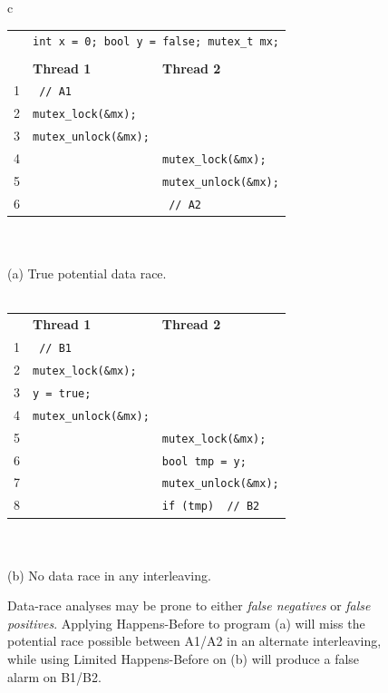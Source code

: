 \begin{figure}[t]
        \small
	\begin{center}
\begin{tabular}{c}
\begin{tabular}{rll}
        & \multicolumn{2}{c}{\texttt{int x = 0; bool y = false; mutex\_t mx;}} \\
        \\
        & {\bf Thread 1} & {\bf Thread 2} \\
        1 & \texttt{\hilight{brickred}{x++;}~// A1} & \\
        2 & \texttt{mutex\_lock(\&mx);} & \\
        3 & \texttt{mutex\_unlock(\&mx);} & \\
        4 & & \texttt{mutex\_lock(\&mx);} \\
        5 & & \texttt{mutex\_unlock(\&mx);} \\
        6 & & \texttt{\hilight{brickred}{x++;}~// A2} \\
\end{tabular}
\\
\\
	{\normalsize (a) True potential data race.}
\\
\\
\begin{tabular}{rll}
        & {\bf Thread 1} & {\bf Thread 2} \\
        1 & \texttt{\hilight{brickred}{x++;}~// B1} & \\
        2 & \texttt{mutex\_lock(\&mx);} & \\
        3 & \texttt{y = true;} & \\
        4 & \texttt{mutex\_unlock(\&mx);} & \\
        5 & & \texttt{mutex\_lock(\&mx);} \\
        6 & & \texttt{bool tmp = y;} \\
        7 & & \texttt{mutex\_unlock(\&mx);} \\
        8 & & \texttt{if (tmp) \hilight{brickred}{x++;}~// B2} \\
\end{tabular}
\\
\\
{\normalsize (b) No data race in any interleaving.}
\end{tabular}
	\end{center}
\caption{{Data-race analyses may be prone to either {\em false negatives} or {\em false positives}.
Applying Happens-Before to program (a) will miss the potential race possible between A1/A2 in an alternate interleaving,
while using Limited Happens-Before on (b) will produce a false alarm on B1/B2.}}
\label{fig:hb-example}
\end{figure}


